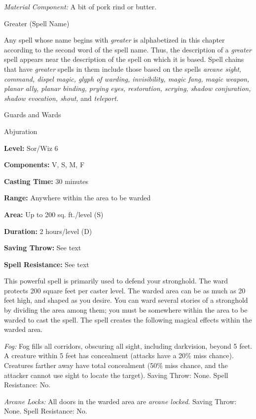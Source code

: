 \documentclass{article}
\begin{document}
\textit{Material Component: }A bit of pork rind or butter.

\vspace{12pt}
Greater (Spell Name)

Any spell whose name begins with \textit{greater }is alphabetized in this chapter 
according to the second word of the spell name. Thus, the description of a \textit{greater 
}spell appears near the description of the spell on which it is based. Spell chains 
that have \textit{greater }spells in them include those based on the spells \textit{arcane 
sight, command, dispel magic, glyph of warding, invisibility, magic fang, magic 
weapon, planar ally, planar binding, prying eyes, restoration, scrying, shadow 
conjuration, shadow evocation, shout, }and \textit{teleport.}

\vspace{12pt}
Guards and Wards

Abjuration

\textbf{Level:} Sor/Wiz 6

\textbf{Components:} V, S, M, F

\textbf{Casting Time:} 30 minutes

\textbf{Range:} Anywhere within the area to be warded

\textbf{Area:} Up to 200 sq. ft./level (S)

\textbf{Duration:} 2 hours/level (D)

\textbf{Saving Throw:} See text

\textbf{Spell Resistance:} See text

This powerful spell is primarily used to defend your stronghold. The ward protects 
200 square feet per caster level. The warded area can be as much as 20 feet high, 
and shaped as you desire. You can ward several stories of a stronghold by dividing 
the area among them; you must be somewhere within the area to be warded to cast 
the spell. The spell creates the following magical effects within the warded area.

\textit{Fog: }Fog fills all corridors, obscuring all sight, including darkvision, 
beyond 5 feet. A creature within 5 feet has concealment (attacks have a 20\% miss 
chance). Creatures farther away have total concealment (50\% miss chance, and the 
attacker cannot use sight to locate the target). Saving Throw: None. Spell Resistance: 
No.

\textit{Arcane Locks: }All doors in the warded area are \textit{arcane locked. 
}Saving Throw: None. Spell Resistance: No.
\end{document}
